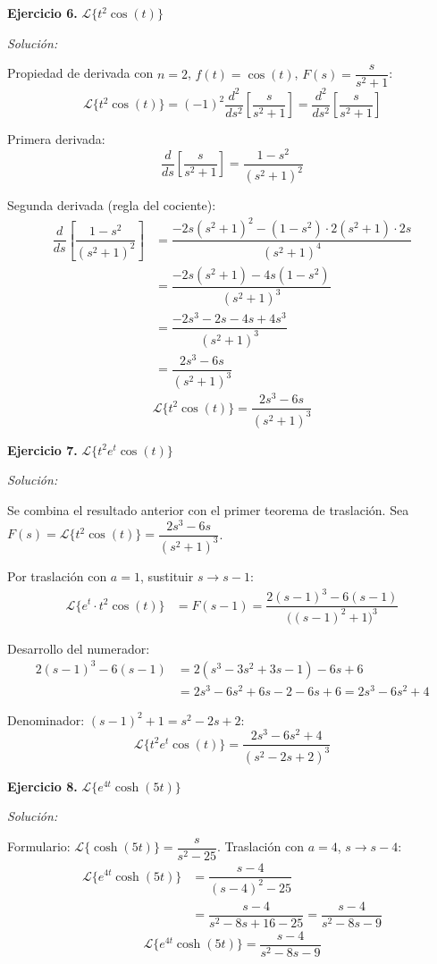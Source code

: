 \documentclass[12pt,letterpaper]{report}
\numberwithin{equation}{chapter}
\numberwithin{figure}{chapter}
\numberwithin{table}{chapter}
\begin{document}
\textbf{Ejercicio 6.} $\mathcal{L}\{t^2\cos(t)\}$

\textit{Solución:}

Propiedad de derivada con $n = 2$, $f(t) = \cos(t)$, $F(s) = \dfrac{s}{s^2 + 1}$:
\[
\mathcal{L}\{t^2\cos(t)\} = (-1)^2\dfrac{d^2}{ds^2}\!\left[\dfrac{s}{s^2 + 1}\right] = \dfrac{d^2}{ds^2}\!\left[\dfrac{s}{s^2 + 1}\right]
\]

Primera derivada:
\[
\dfrac{d}{ds}\!\left[\dfrac{s}{s^2 + 1}\right] = \dfrac{1 - s^2}{(s^2 + 1)^2}
\]

Segunda derivada (regla del cociente):
\begin{align*}
\dfrac{d}{ds}\!\left[\dfrac{1 - s^2}{(s^2 + 1)^2}\right] &= \dfrac{-2s(s^2 + 1)^2 - (1 - s^2)\cdot 2(s^2 + 1)\cdot 2s}{(s^2 + 1)^4} \\[4pt]
&= \dfrac{-2s(s^2 + 1) - 4s(1 - s^2)}{(s^2 + 1)^3} \\[4pt]
&= \dfrac{-2s^3 - 2s - 4s + 4s^3}{(s^2 + 1)^3} \\[4pt]
&= \dfrac{2s^3 - 6s}{(s^2 + 1)^3}
\end{align*}
\[
\boxed{\mathcal{L}\{t^2\cos(t)\} = \dfrac{2s^3 - 6s}{(s^2 + 1)^3}}
\]

\textbf{Ejercicio 7.} $\mathcal{L}\{t^2 e^{t}\cos(t)\}$

\textit{Solución:}

Se combina el resultado anterior con el primer teorema de traslación. Sea $F(s) = \mathcal{L}\{t^2\cos(t)\} = \dfrac{2s^3 - 6s}{(s^2 + 1)^3}$.

Por traslación con $a = 1$, sustituir $s \to s - 1$:
\begin{align*}
\mathcal{L}\{e^{t}\cdot t^2\cos(t)\} &= F(s - 1) = \dfrac{2(s-1)^3 - 6(s-1)}{\bigl((s-1)^2 + 1\bigr)^3}
\end{align*}

Desarrollo del numerador:
\begin{align*}
2(s-1)^3 - 6(s-1) &= 2(s^3 - 3s^2 + 3s - 1) - 6s + 6 \\[4pt]
&= 2s^3 - 6s^2 + 6s - 2 - 6s + 6 = 2s^3 - 6s^2 + 4
\end{align*}

Denominador: $(s-1)^2 + 1 = s^2 - 2s + 2$:
\[
\boxed{\mathcal{L}\{t^2 e^{t}\cos(t)\} = \dfrac{2s^3 - 6s^2 + 4}{(s^2 - 2s + 2)^3}}
\]

\textbf{Ejercicio 8.} $\mathcal{L}\{e^{4t}\cosh(5t)\}$

\textit{Solución:}

Formulario: $\mathcal{L}\{\cosh(5t)\} = \dfrac{s}{s^2 - 25}$. Traslación con $a = 4$, $s \to s - 4$:
\begin{align*}
\mathcal{L}\{e^{4t}\cosh(5t)\} &= \dfrac{s - 4}{(s-4)^2 - 25} \\[4pt]
&= \dfrac{s - 4}{s^2 - 8s + 16 - 25} = \dfrac{s - 4}{s^2 - 8s - 9}
\end{align*}
\[
\boxed{\mathcal{L}\{e^{4t}\cosh(5t)\} = \dfrac{s - 4}{s^2 - 8s - 9}}
\]
\end{document}

